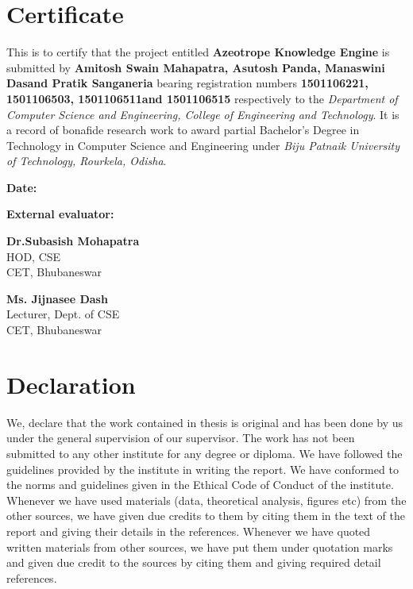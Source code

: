 \documentclass[a4paper,12pt,oneside]{book}
\newcommand{\department}{Computer Science and Engineering}
\newcommand{\departmentshort}{CSE}
\newcommand{\memberonename}{Amitosh Swain Mahapatra}
\newcommand{\memberoneregdno}{1501106221}
\newcommand{\membertwoname}{Asutosh Panda}
\newcommand{\membertworegdno}{1501106503}
\newcommand{\memberthreename}{Manaswini Das}
\newcommand{\memberthreeregdno}{1501106511}
\newcommand{\memberfourname}{Pratik Sanganeria}
\newcommand{\memberfourregdno}{1501106515}
\newcommand{\guidename}{Ms. Jijnasee Dash}
\newcommand{\guidedesignation}{Lecturer, Dept. of CSE}
\newcommand{\departmenthod}{Dr.Subasish Mohapatra}
\begin{document}
\chapter*{\centering Certificate}

This is to certify that the project entitled \textbf{Azeotrope Knowledge Engine} is submitted by \textbf{\memberonename, \membertwoname, \memberthreename and \memberfourname} bearing registration numbers \textbf{\memberoneregdno, \membertworegdno, \memberthreeregdno and \memberfourregdno} respectively to the \textit{Department of \department, College of Engineering and Technology}. It is a record of bonafide research work to award partial Bachelor’s Degree in Technology in Computer Science and Engineering under \textit{Biju Patnaik University of Technology, Rourkela, Odisha}.

\vspace{2cm}

\noindent\textbf{Date:}

\vspace{1cm}

\begin{multicols}{2}
    \noindent
    \begin{varwidth}{\textwidth}
    \textbf{External evaluator:}
    \end{varwidth}
    
    \columnbreak
    
    \hfill
    \begin{varwidth}{\textwidth}
        \textbf{\departmenthod}\\
        HOD, \departmentshort\\
        CET, Bhubaneswar
        
    \vspace{2cm}
    
        \textbf{\guidename}\\
        \guidedesignation\\
        CET, Bhubaneswar
    \end{varwidth}
    
    

\end{multicols}

\chapter*{\centering Declaration}

We, declare that the work contained in thesis is original and has been done by us under the general supervision of our supervisor. The work has not been submitted to any other institute for any degree or diploma. We have followed the guidelines provided by the institute in writing the report. We have conformed to the norms and guidelines given in the Ethical Code of Conduct of the institute. Whenever we have used materials (data, theoretical analysis, figures etc) from the other sources,  we have given due credits to them by citing them in the text of the report and giving their details in the references. Whenever we have quoted written materials from other sources, we have put them under quotation marks and given due credit to the sources by citing them and giving required detail references.
\end{document}
